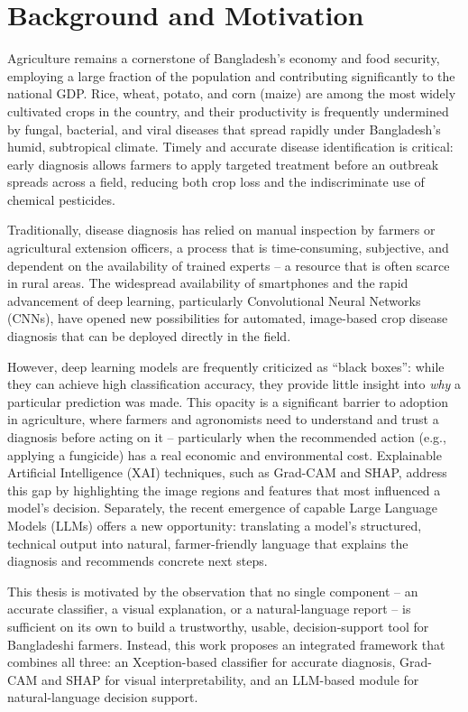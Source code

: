 \documentclass[12pt,a4paper,oneside]{report}
\begin{document}
\section{Background and Motivation}
Agriculture remains a cornerstone of Bangladesh's economy and food security, employing a large fraction of the
population and contributing significantly to the national GDP. Rice, wheat, potato, and corn (maize) are among
the most widely cultivated crops in the country, and their productivity is frequently undermined by fungal,
bacterial, and viral diseases that spread rapidly under Bangladesh's humid, subtropical climate. Timely and
accurate disease identification is critical: early diagnosis allows farmers to apply targeted treatment before an
outbreak spreads across a field, reducing both crop loss and the indiscriminate use of chemical pesticides.

Traditionally, disease diagnosis has relied on manual inspection by farmers or agricultural extension officers,
a process that is time-consuming, subjective, and dependent on the availability of trained experts -- a resource
that is often scarce in rural areas. The widespread availability of smartphones and the rapid advancement of deep
learning, particularly Convolutional Neural Networks (CNNs), have opened new possibilities for automated,
image-based crop disease diagnosis that can be deployed directly in the field.

However, deep learning models are frequently criticized as ``black boxes'': while they can achieve high
classification accuracy, they provide little insight into \textit{why} a particular prediction was made. This
opacity is a significant barrier to adoption in agriculture, where farmers and agronomists need to understand and
trust a diagnosis before acting on it -- particularly when the recommended action (e.g., applying a fungicide)
has a real economic and environmental cost. Explainable Artificial Intelligence (XAI) techniques, such as
Grad-CAM and SHAP, address this gap by highlighting the image regions and features that most influenced a
model's decision. Separately, the recent emergence of capable Large Language Models (LLMs) offers a new
opportunity: translating a model's structured, technical output into natural, farmer-friendly language that
explains the diagnosis and recommends concrete next steps.

This thesis is motivated by the observation that no single component -- an accurate classifier, a visual
explanation, or a natural-language report -- is sufficient on its own to build a trustworthy, usable, decision-support
tool for Bangladeshi farmers. Instead, this work proposes an integrated framework that combines all three: an
Xception-based classifier for accurate diagnosis, Grad-CAM and SHAP for visual interpretability, and an LLM-based
module for natural-language decision support.
\end{document}
